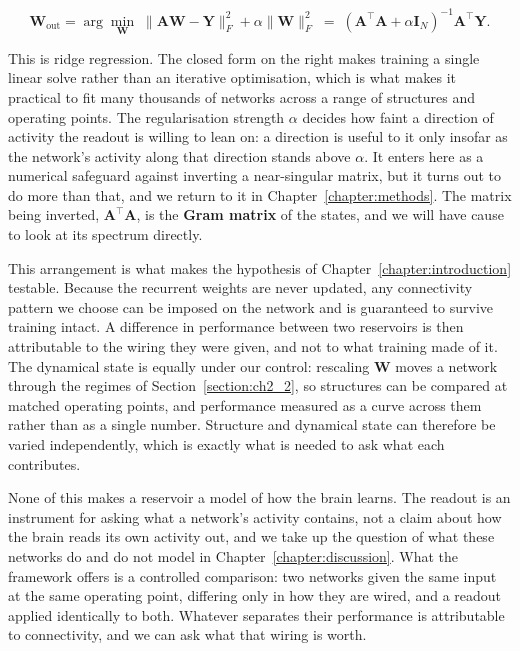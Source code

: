 \begin{equation}
    \mathbf{W}_{\!\mathrm{out}} = \arg\min_{\mathbf{W}} \; \lVert \mathbf{A}\mathbf{W} - \mathbf{Y} \rVert_{F}^{2} + \alpha \lVert \mathbf{W} \rVert_{F}^{2}
    \; = \; (\mathbf{A}^{\top}\mathbf{A} + \alpha \mathbf{I}_N)^{-1}\mathbf{A}^{\top}\mathbf{Y}.
    \label{eq:ridge}
\end{equation}

This is ridge regression. The closed form on the right makes training a single linear solve rather
than an iterative optimisation, which is what makes it practical to fit many thousands of networks
across a range of structures and operating points. The regularisation
strength $\alpha$ decides how faint a direction of activity the readout is willing to lean on: a
direction is useful to it only insofar as the network's activity along that direction stands above
$\alpha$. It enters here as a numerical safeguard against inverting a near-singular matrix, but it
turns out to do more than that, and we return to it in Chapter~\ref{chapter:methods}. The matrix
being inverted, $\mathbf{A}^{\top}\mathbf{A}$, is the \textbf{Gram matrix} of the states, and we will have cause to
look at its spectrum directly.

This arrangement is what makes the hypothesis of Chapter~\ref{chapter:introduction} testable. Because
the recurrent weights are never updated, any connectivity pattern we choose can be imposed on the
network and is guaranteed to survive training intact. A difference in performance between two
reservoirs is then attributable to the wiring they were given, and not to what training made of it.
The dynamical state is equally under our control: rescaling $\mathbf{W}$ moves a network through the
regimes of Section~\ref{section:ch2_2}, so structures can be compared at matched operating points,
and performance measured as a curve across them rather than as a single number. Structure and
dynamical state can therefore be varied independently, which is exactly what is needed to ask what
each contributes.

None of this makes a reservoir a model of how the brain learns. The readout is an instrument for
asking what a network's activity contains, not a claim about how the brain reads its own activity
out, and we take up the question of what these networks do and do not model in
Chapter~\ref{chapter:discussion}. What the framework offers is a controlled comparison: two networks
given the same input at the same operating point, differing only in how they are wired, and a
readout applied identically to both. Whatever separates their performance is attributable to connectivity, 
and we can ask what that wiring is worth.




